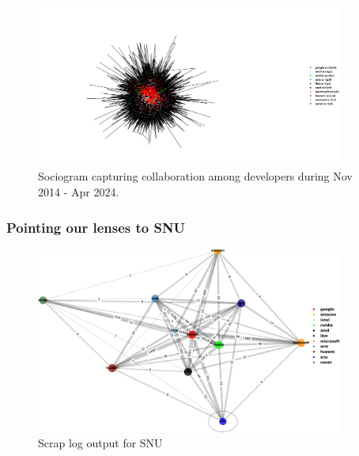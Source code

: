 \documentclass[CHICAGO,Times1COL]{WileyNJDv5} %
\begin{document}
\begin{figure}[h]
 \centering
 \includegraphics[draft=false,
keepaspectratio=true,width=0.9\textwidth,trim={0 1cm 0 2cm},clip]{Figures/all.pdf}
 \caption{Sociogram capturing collaboration among developers during Nov 2014 - Apr 2024.}
 \label{figall}
\end{figure}





\subsubsection{Pointing our lenses to SNU}




\begin{figure}[h]
\centering
\includegraphics[keepaspectratio=true,width=0.9\textwidth]{./Figures/noo/SNU_cropped.pdf}
\caption{Scrap log output for SNU\label{figSNU}}
\end{figure}
\end{document}
